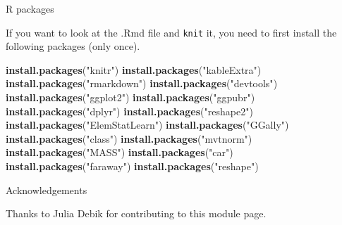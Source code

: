 \documentclass[ignorenonframetext,]{beamer}
\newenvironment{Shaded}{\begin{snugshade}}{\end{snugshade}}
\newcommand{\KeywordTok}[1]{\textcolor[rgb]{0.13,0.29,0.53}{\textbf{#1}}}
\newcommand{\StringTok}[1]{\textcolor[rgb]{0.31,0.60,0.02}{#1}}
\newcommand{\NormalTok}[1]{#1}
\begin{document}
\begin{frame}[fragile]{ R packages}

If you want to look at the .Rmd file and \texttt{knit} it, you need to
first install the following packages (only once).

\begin{Shaded}
\begin{Highlighting}[]
\KeywordTok{install.packages}\NormalTok{(}\StringTok{"knitr"}\NormalTok{)}
\KeywordTok{install.packages}\NormalTok{(}\StringTok{"kableExtra"}\NormalTok{)}
\KeywordTok{install.packages}\NormalTok{(}\StringTok{"rmarkdown"}\NormalTok{)}
\KeywordTok{install.packages}\NormalTok{(}\StringTok{"devtools"}\NormalTok{)}
\KeywordTok{install.packages}\NormalTok{(}\StringTok{"ggplot2"}\NormalTok{)}
\KeywordTok{install.packages}\NormalTok{(}\StringTok{"ggpubr"}\NormalTok{)}
\KeywordTok{install.packages}\NormalTok{(}\StringTok{"dplyr"}\NormalTok{)}
\KeywordTok{install.packages}\NormalTok{(}\StringTok{"reshape2"}\NormalTok{)}
\KeywordTok{install.packages}\NormalTok{(}\StringTok{"ElemStatLearn"}\NormalTok{)}
\KeywordTok{install.packages}\NormalTok{(}\StringTok{"GGally"}\NormalTok{)}
\KeywordTok{install.packages}\NormalTok{(}\StringTok{"class"}\NormalTok{)}
\KeywordTok{install.packages}\NormalTok{(}\StringTok{"mvtnorm"}\NormalTok{)}
\KeywordTok{install.packages}\NormalTok{(}\StringTok{"MASS"}\NormalTok{)}
\KeywordTok{install.packages}\NormalTok{(}\StringTok{"car"}\NormalTok{)}
\KeywordTok{install.packages}\NormalTok{(}\StringTok{"faraway"}\NormalTok{)}
\KeywordTok{install.packages}\NormalTok{(}\StringTok{"reshape"}\NormalTok{)}
\end{Highlighting}
\end{Shaded}

\end{frame}

\begin{frame}{Acknowledgements}

Thanks to Julia Debik for contributing to this module page.

\end{frame}
\end{document}
